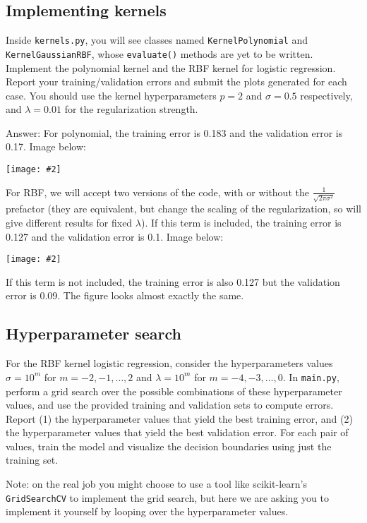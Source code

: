 \documentclass{article}
\def\ans#1{\par\gre{Answer: #1}}
\def\answer#1{\ans{#1}}
\def\blu#1{{\color{blu}#1}}
\def\gre#1{{\color{gre}#1}}
\newcommand{\centerfig}[2]{\begin{center}\texttt{[image: \#2]}\end{center}}
\begin{document}
\subsection{Implementing kernels}

Inside \texttt{kernels.py}, you will see classes named \texttt{KernelPolynomial} and \texttt{KernelGaussianRBF}, whose \texttt{evaluate()} methods are yet to be written. \blu{Implement the polynomial kernel and the RBF kernel for logistic regression. Report your training/validation errors and submit the plots generated for each case}. You should use the kernel hyperparameters $p=2$ and $\sigma=0.5$ respectively, and $\lambda=0.01$ for the regularization strength.

\answer{For polynomial, the training error is 0.183 and the validation error is 0.17. Image below:\\
\centerfig{0.5}{../figs/logRegPoly.png} For RBF, we will accept two versions of the code, with or without the $\frac{1}{\sqrt{2\pi\sigma^2}}$ prefactor (they are equivalent, but change the scaling of the regularization, so will give different results for fixed $\lambda$). If this term is included, the training error is 0.127 and the validation error is 0.1. Image below:\\ \centerfig{0.5}{../figs/logRegRBF.png} If this term is not included, the training error is also 0.127 but the validation error is 0.09. The figure looks almost exactly the same.}


\subsection{Hyperparameter search}

For the RBF kernel logistic regression, consider the hyperparameters values $\sigma=10^m$ for $m=-2,-1,\ldots,2$ and $\lambda=10^m$ for $m=-4,-3,\ldots,0$. \blu{In \texttt{main.py}, perform a grid search over the possible combinations of these hyperparameter values, and use the provided training and validation sets to compute errors. Report (1) the hyperparameter values that yield the best training error, and (2) the hyperparameter values that yield the best validation error. For each pair of values, train the model and visualize the decision boundaries using just the training set.}

Note: on the real job you might choose to use a tool like scikit-learn's \texttt{GridSearchCV} to implement the grid search, but here we are asking you to implement it yourself by looping over the hyperparameter values.
\end{document}
